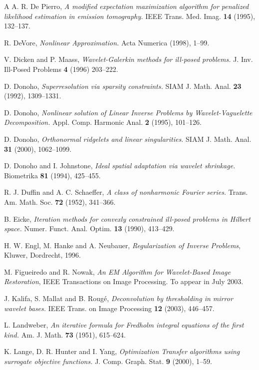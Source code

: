 \documentclass[10pt]{article}
\begin{document}
\begin{thebibliography}{A}
 A. R. De Pierro, \textit{A modified expectation
maximization algorithm for penalized likelihood estimation in emission
tomography.} IEEE Trans. Med. Imag. \textbf{14} (1995), 132--137.

 R. DeVore, \textit{Nonlinear Approximation.} Acta
Numerica (1998), 1--99.

 V. Dicken and P. Maass, \textit{Wavelet-Galerkin
methods for ill-posed problems.} J. Inv. Ill-Posed Problems  \textbf{4} (1996)
203--222.

 D. Donoho, \textit{Superresolution via sparsity
constraints.}
SIAM J. Math. Anal. \textbf{23} (1992), 1309--1331.

 D. Donoho, \textit{Nonlinear solution of Linear
Inverse Problems by Wavelet-Vaguelette Decomposition.} Appl. Comp. Harmonic
Anal. \textbf{2} (1995), 101--126.

 D. Donoho, \textit{Orthonormal ridgelets and linear
singularities.} SIAM J. Math. Anal.
\textbf{31} (2000), 1062--1099.

 D. Donoho and I. Johnstone, \textit{Ideal
spatial adaptation via wavelet shrinkage.} Biometrika
\textbf{81} (1994), 425--455.

 R. J. Duffin and A. C. Schaeffer, \textit{A class of
nonharmonic Fourier series.} Trans. Am. Math. Soc. \textbf{72} (1952),
341--366.

 B. Eicke, \textit{Iteration methods for convexly
constrained ill-posed problems in Hilbert space.} Numer. Funct. Anal. Optim.
\textbf{13} (1990), 413--429.

 H. W. Engl, M. Hanke and A. Neubauer,
\textit{Regularization of Inverse Problems}, Kluwer, Dordrecht, 1996.

 M. Figueiredo and R. Nowak, \textit{An EM Algorithm
for Wavelet-Based Image Restoration}, IEEE Transactions on Image Processing.
To appear in July 2003.

 J. Kalifa, S. Mallat and B. Roug\'e,
\textit{Deconvolution by thresholding in mirror wavelet bases.} IEEE Trans. on
Image Processing \textbf{12} (2003), 446--457.

 L. Landweber, \textit{An iterative formula for Fredholm
integral equations of the first kind.} Am. J. Math.
\textbf{73} (1951), 615--624.

  K. Lange, D. R. Hunter and I. Yang,
\textit{Optimization Transfer algorithms using surrogate objective functions.}
J. Comp. Graph. Stat. \textbf{9} (2000), 1--59.


\end{thebibliography}
\end{document}
